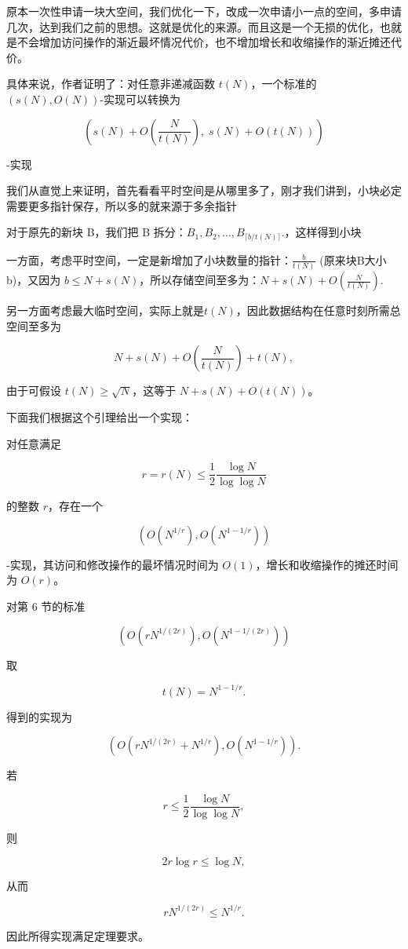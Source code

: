 \documentclass[12pt,a4paper]{article}
\begin{document}
原本一次性申请一块大空间，我们优化一下，改成一次申请小一点的空间，多申请几次，达到我们之前的思想。这就是优化的来源。而且这是一个无损的优化，也就是不会增加访问操作的渐近最坏情况代价，也不增加增长和收缩操作的渐近摊还代价。

具体来说，作者证明了：对任意非递减函数 $t(N)$，一个标准的 $(s(N),O(N))$-实现可以转换为

$$
\left(s(N)+O\!\left(\frac{N}{t(N)}\right),\;s(N)+O(t(N))\right)
$$

-实现

我们从直觉上来证明，首先看看平时空间是从哪里多了，刚才我们讲到，小块必定需要更多指针保存，所以多的就来源于多余指针

对于原先的新块 B，我们把 B 拆分：$B_1,B_2,\ldots,B_{\lceil b/t(N)\rceil}.$，这样得到小块

一方面，考虑平时空间，一定是新增加了小块数量的指针：$\frac{b}{t(N)}$ (原来块B大小b)，又因为 $b \le N+s(N)$，所以存储空间至多为：$N+s(N)+O\!\left(\frac{N}{t(N)}\right).$

另一方面考虑最大临时空间，实际上就是$t(N)$，因此数据结构在任意时刻所需总空间至多为

$$
N+s(N)+O\!\left(\frac{N}{t(N)}\right)+t(N),
$$

由于可假设 $t(N)\ge\sqrt N$，这等于 $N+s(N)+O(t(N))$。

下面我们根据这个引理给出一个实现：

对任意满足

$$
r=r(N)\le\frac12\frac{\log N}{\log\log N}
$$

的整数 $r$，存在一个

$$
(O(N^{1/r}),O(N^{1-1/r}))
$$

-实现，其访问和修改操作的最坏情况时间为 $O(1)$，增长和收缩操作的摊还时间为 $O(r)$。

对第 6 节的标准

$$
(O(rN^{1/(2r)}),O(N^{1-1/(2r)}))
$$

取

$$
t(N)=N^{1-1/r}.
$$

得到的实现为

$$
(O(rN^{1/(2r)}+N^{1/r}),O(N^{1-1/r})).
$$

若

$$
r\le\frac12\frac{\log N}{\log\log N},
$$

则

$$
2r\log r\le\log N,
$$

从而

$$
rN^{1/(2r)}\le N^{1/r}.
$$

因此所得实现满足定理要求。
\end{document}
